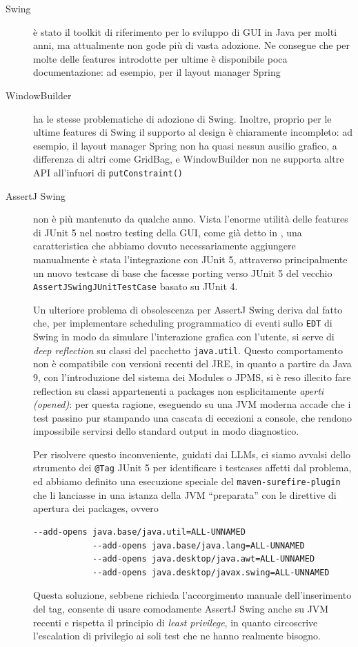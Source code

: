 \begin{description}
	\item[Swing] è stato il toolkit di riferimento per lo sviluppo di GUI in Java per molti anni, ma attualmente non gode più di vasta adozione. Ne consegue che per molte delle features introdotte per ultime è disponibile poca documentazione: ad esempio, per il layout manager Spring
	\item[WindowBuilder] ha le stesse problematiche di adozione di Swing. Inoltre, proprio per le ultime features di Swing il supporto al design è chiaramente incompleto: ad esempio, il layout manager Spring non ha quasi nessun ausilio grafico, a differenza di altri come GridBag, e WindowBuilder non ne supporta altre API all'infuori di \texttt{putConstraint()}
	\item[AssertJ Swing] non è più mantenuto da qualche anno. Vista l'enorme utilità delle features di JUnit 5 nel nostro testing della GUI, come già detto in , una caratteristica che abbiamo dovuto necessariamente aggiungere manualmente è stata l'integrazione con JUnit 5, attraverso principalmente un nuovo testcase di base che facesse porting verso JUnit 5 del vecchio \texttt{AssertJSwingJUnitTestCase} basato su JUnit 4.
	
	Un ulteriore problema di obsolescenza per AssertJ Swing deriva dal fatto che, per implementare scheduling programmatico di eventi sullo \texttt{EDT} di Swing in modo da simulare l'interazione grafica con l'utente, si serve di \emph{deep reflection} su classi del pacchetto \texttt{java.util}. Questo comportamento non è compatibile con versioni recenti del JRE, in quanto a partire da Java 9, con l'introduzione del sistema dei Modules o JPMS, si è reso illecito fare reflection su classi appartenenti a packages non esplicitamente \emph{aperti (opened)}: per questa ragione, eseguendo su una JVM moderna accade che i test passino pur stampando una cascata di eccezioni a console, che rendono impossibile servirsi dello standard output in modo diagnostico.
	
	Per risolvere questo inconveniente, guidati dai LLMs, ci siamo avvalsi dello strumento dei \texttt{@Tag} JUnit 5 per identificare i testcases affetti dal problema, ed abbiamo definito una esecuzione speciale del \texttt{maven-surefire-plugin} che li lanciasse in una istanza della JVM ``preparata'' con le direttive di apertura dei packages, ovvero
	\begin{lstlisting}[language=bash]
			--add-opens java.base/java.util=ALL-UNNAMED
			--add-opens java.base/java.lang=ALL-UNNAMED
			--add-opens java.desktop/java.awt=ALL-UNNAMED
			--add-opens java.desktop/javax.swing=ALL-UNNAMED
	\end{lstlisting}
	Questa soluzione, sebbene richieda l'accorgimento manuale dell'inserimento del tag, consente di usare comodamente AssertJ Swing anche su JVM recenti e rispetta il principio di \emph{least privilege}, in quanto circoscrive l'escalation di privilegio ai soli test che ne hanno realmente bisogno.   
\end{description}